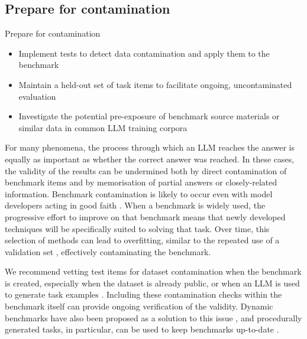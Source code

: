 \subsection{Prepare for contamination}
\label{rec:contamination}
\begin{checklistbox}{Prepare for contamination}
    \begin{itemize}[leftmargin=5pt, label=\scriptsize$\square$]
    \item Implement tests to detect data contamination and apply them to the benchmark
    \item Maintain a held-out set of task items to facilitate ongoing, uncontaminated evaluation
    \item Investigate the potential pre-exposure of benchmark source materials or similar data in common LLM training corpora
\end{itemize}
\end{checklistbox}

For many phenomena, the process through which an LLM reaches the answer is equally as important as whether the correct answer was reached. In these cases, the validity of the results can be undermined both by direct contamination of benchmark items and by memorisation of partial answers or closely-related information. Benchmark contamination is likely to occur even with model developers acting in good faith \cite{zhouDontMakeYour2023}. 
When a benchmark is widely used, the progressive effort to improve on that benchmark means that newly developed techniques will be specifically suited to solving that task. Over time, this selection of methods can lead to overfitting, similar to the repeated use of a validation set \cite{zhangCarefulExaminationLarge2024a}, effectively contaminating the benchmark.

We recommend vetting test items for dataset contamination when the benchmark is created, especially when the dataset is already public, or when an LLM is used to generate task examples \cite{mainiLLMDatasetInference2024}. Including these contamination checks within the benchmark itself can provide ongoing verification of the validity. Dynamic benchmarks have also been proposed as a solution to this issue \cite{kielaDynabenchRethinkingBenchmarking2021d}, and procedurally generated tasks, in particular, can be used to keep benchmarks up-to-date \cite{khoujaLINGOLYTOODisentanglingMemorisation2025}.


